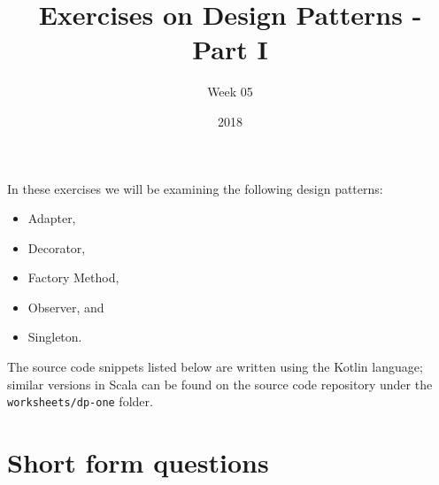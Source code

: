 \documentclass[answers,12pt,a4paper]{exam}
\title{Exercises on Design Patterns - Part I}
\author{Week 05}
\date{2018}
\begin{document}
\maketitle

In these exercises we will be examining the following design patterns:
\begin{itemize}
\item Adapter,
\item Decorator,
\item Factory Method,
\item Observer, and
\item Singleton.
\end{itemize}
The source code snippets listed below are written using the Kotlin language; similar 
versions in Scala can be found on the source code repository under the \verb!worksheets/dp-one! folder. 

\section*{Short form questions}
\end{document}
